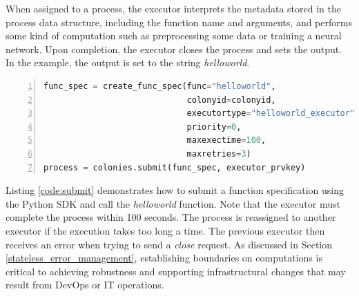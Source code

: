 \documentclass{article}
\begin{document}
When assigned to a process, the executor interprets the metadata stored in the process data structure, including the function name and arguments, and performs some kind of computation such as preprocessing some data or training a neural network. Upon completion, the executor closes the process and sets the output. In the example, the output is set to the string \emph{helloworld}.

\begin{lstlisting}[showstringspaces=false, frame=lines, numbers=left, numberstyle=\scriptsize, backgroundcolor=\color{background}, basicstyle=\small, language=Python, label=code:submit, caption=Submitting a function specification.]
func_spec = create_func_spec(func="helloworld",
                             colonyid=colonyid,
                             executortype="helloworld_executor",
                             priority=0,
                             maxexectime=100,
                             maxretries=3)
process = colonies.submit(func_spec, executor_prvkey)
\end{lstlisting}

Listing \ref{code:submit} demonstrates how to submit a function specification using the Python SDK and call the \emph{helloworld} function. Note that the executor must complete the process within 100 seconds. The process is reassigned to another executor if the execution takes too long a time. The previous executor then receives an error when trying to send a \emph{close} request. As discussed in Section \ref{stateless_error_management}, establishing boundaries on computations is critical to achieving robustness and supporting infrastructural changes that may result from DevOps or IT operations.
\end{document}
